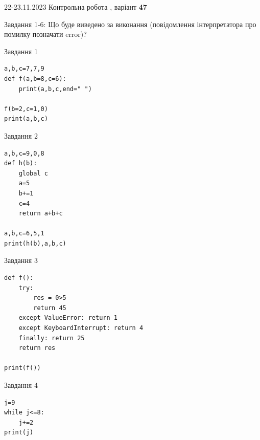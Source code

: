 \documentclass[12pt, ukrainian]{article}
\begin{document}
{{22-23.11.2023 Контрольна робота , варіант  \No \textbf { 47 }\par}}
{

Завдання 1-6: Що буде виведено за виконання (повідомлення інтерпретатора про помилку позначати error)?


\begin{minipage}[t]{9.7cm}                
{\begin{center}Завдання {1}\end{center}}
\begin{verbatim}
a,b,c=7,7,9
def f(a,b=8,c=6):
    print(a,b,c,end=" ")

f(b=2,c=1,0)
print(a,b,c)
\end{verbatim}     
\end{minipage}
\vline \hspace{8mm}
\begin{minipage}[t]{8.0cm}                
{\begin{center}Завдання {2}\end{center}}
\begin{verbatim}
a,b,c=9,0,8
def h(b):
    global c
    a=5
    b+=1
    c=4
    return a+b+c

a,b,c=6,5,1
print(h(b),a,b,c)
\end{verbatim}     
\end{minipage}

\vspace{15mm}
\begin{minipage}[t]{9.7cm}                
{\begin{center}Завдання {3}\end{center}}
\begin{verbatim}
def f():
    try:
        res = 0>5
        return 45
    except ValueError: return 1
    except KeyboardInterrupt: return 4
    finally: return 25
    return res

print(f())
\end{verbatim}     
\end{minipage}
\vline \hspace{8mm}
\begin{minipage}[t]{8.0cm}                
{\begin{center}Завдання {4}\end{center}}
\begin{verbatim}
j=9
while j<=8:
    j+=2
print(j)
\end{verbatim}     
\end{minipage}

}
\end{document}
